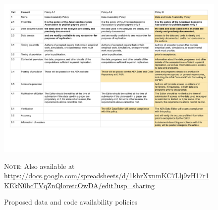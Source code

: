 \documentclass[AEJ]{AEA}
\begin{document}
\begin{figure}
	\includegraphics[width=\textwidth]{images/AEA_Data_and_Code_Availability_Policies_-_Policies.pdf}
	\caption{Proposed data and code availability policies\label{fig:policies}}
	
	\centering \footnotesize \textsc{Note:} Also available at \url{https://docs.google.com/spreadsheets/d/1khrXxnmKC7Llj9vH17r1KEkN0hcTVqZnQloretcOwDA/edit?usp=sharing}
\end{figure}
\end{document}
